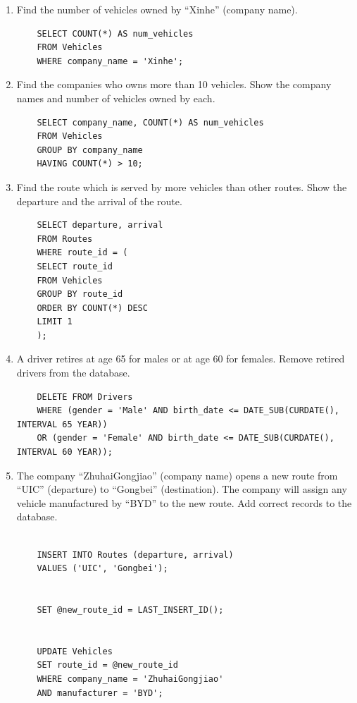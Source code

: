 \documentclass{article}
\begin{document}
\begin{enumerate}
\def\labelenumi{\alph{enumi})}
\item
  Find the number of vehicles owned by ``Xinhe'' (company name).
  
  \begin{verbatim}
  	SELECT COUNT(*) AS num_vehicles
  	FROM Vehicles
  	WHERE company_name = 'Xinhe';
  \end{verbatim}
  
\item
  Find the companies who owns more than 10 vehicles. Show the company
  names and number of vehicles owned by each.
  
  \begin{verbatim}
  	SELECT company_name, COUNT(*) AS num_vehicles
  	FROM Vehicles
  	GROUP BY company_name
  	HAVING COUNT(*) > 10;
  \end{verbatim}
\item
  Find the route which is served by more vehicles than other routes.
  Show the departure and the arrival of the route.
  
  \begin{verbatim}
  	SELECT departure, arrival
  	FROM Routes
  	WHERE route_id = (
  	SELECT route_id
  	FROM Vehicles
  	GROUP BY route_id
  	ORDER BY COUNT(*) DESC
  	LIMIT 1
  	);
  \end{verbatim}
\item
  A driver retires at age 65 for males or at age 60 for females. Remove
  retired drivers from the database.
  
  \begin{verbatim}
  	DELETE FROM Drivers
  	WHERE (gender = 'Male' AND birth_date <= DATE_SUB(CURDATE(), INTERVAL 65 YEAR))
  	OR (gender = 'Female' AND birth_date <= DATE_SUB(CURDATE(), INTERVAL 60 YEAR));
  \end{verbatim}
\item
  The company ``ZhuhaiGongjiao'' (company name) opens a new route from
  ``UIC'' (departure) to ``Gongbei'' (destination). The company will
  assign any vehicle manufactured by ``BYD'' to the new route. Add
  correct records to the database.
  
  \begin{verbatim}

  	INSERT INTO Routes (departure, arrival)
  	VALUES ('UIC', 'Gongbei');
  	

  	SET @new_route_id = LAST_INSERT_ID();
  	

  	UPDATE Vehicles
  	SET route_id = @new_route_id
  	WHERE company_name = 'ZhuhaiGongjiao'
  	AND manufacturer = 'BYD';
  \end{verbatim}
\end{enumerate}
\end{document}
